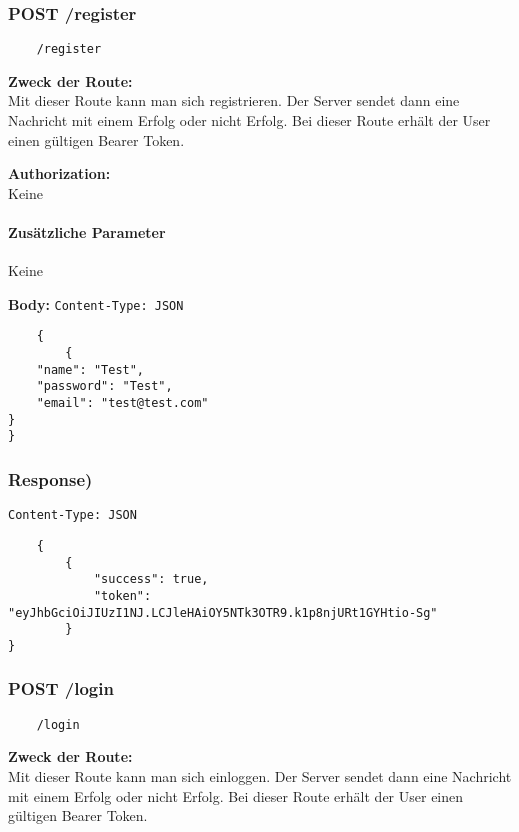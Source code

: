 
\subsubsection{POST /register}

\begin{lstlisting}
    /register
\end{lstlisting}

\textbf{Zweck der Route:} \\
Mit dieser Route kann man sich registrieren. Der Server
sendet dann eine Nachricht mit einem Erfolg oder nicht Erfolg.
Bei dieser Route erhält der User einen gültigen Bearer Token.

\textbf{Authorization:} \\
Keine

\paragraph{Zusätzliche Parameter}
Keine

\textbf{Body:}
\lstinline{Content-Type: JSON}
\begin{lstlisting}
    {
        {
    "name": "Test",
    "password": "Test",
    "email": "test@test.com"
}  
}
\end{lstlisting}

\subsubsection{Response)}

\lstinline{Content-Type: JSON}
\begin{lstlisting}
    {
        {
            "success": true,
            "token": "eyJhbGciOiJIUzI1NJ.LCJleHAiOY5NTk3OTR9.k1p8njURt1GYHtio-Sg"
        }
}
\end{lstlisting}

\pagebreak

\subsubsection{POST /login}

\begin{lstlisting}
    /login
\end{lstlisting}

\textbf{Zweck der Route:} \\
Mit dieser Route kann man sich einloggen. Der Server
sendet dann eine Nachricht mit einem Erfolg oder nicht Erfolg.
Bei dieser Route erhält der User einen gültigen Bearer Token.

